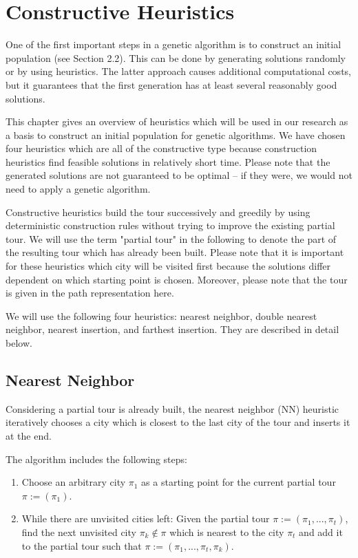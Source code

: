 \section{Constructive Heuristics}
\label{sec:heuristics}

One of the first important steps in a genetic algorithm is to construct an initial population (see Section 2.2). This can be done by generating solutions randomly or by using heuristics. The latter approach causes additional computational costs, but it guarantees that the first generation has at least several reasonably good solutions. \par
 
This chapter gives an overview of heuristics \cite{knust2020script} which will be used in our research as a basis to construct an initial population for genetic algorithms. We have chosen four heuristics which are all of the constructive type because construction heuristics find feasible solutions in relatively short time. Please note that the generated solutions are not guaranteed to be optimal -- if they were, we would not need to apply a genetic algorithm.\par 

Constructive heuristics build the tour successively and greedily by using deterministic construction rules without trying to improve the existing partial tour.  We will use the term "partial tour" in the following to denote the part of the resulting tour which has already been built. Please note that it is important for these heuristics which city will be visited first because the solutions differ dependent on which starting point is chosen. Moreover, please note that the tour is given in the path representation here.\par

We will use the following four heuristics: nearest neighbor, double nearest neighbor, nearest insertion, and farthest insertion. They are described in detail below.

\subsection{Nearest Neighbor}
\label{subsec:nn}

Considering a partial tour is already built, the nearest neighbor (NN) heuristic iteratively chooses a city which is closest to the last city of the tour and inserts it at the end.

The algorithm includes the following steps:
\begin{enumerate}
	\item Choose an arbitrary city $\pi_{1}$ as a starting point for the current partial tour $\pi:= (\pi_{1})$.
	\item  While there are unvisited cities left:
	\subitem Given the partial tour $\pi:= (\pi_{1}, ..., \pi_{t})$, find the next unvisited city $\pi_{k} \notin \pi$ which is nearest to the city $\pi_{t}$ and add it to the partial tour such that $\pi:= (\pi_{1}, ..., \pi_{t}, \pi_{k})$.
	
\end{enumerate}


